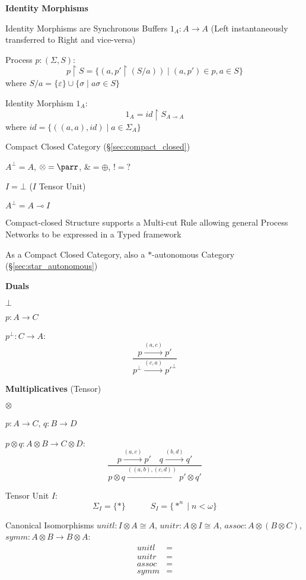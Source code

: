 \textbf{Identity Morphisms}

Identity Morphisms are Synchronous Buffers $1_A : A \rightarrow A$
(Left instantaneously transferred to Right and vice-versa)

Process $p : (\Sigma,S)$:
\[
  p \upharpoonright S = \{(a,p'\upharpoonright(S/a))
    \mid (a,p') \in p, a \in S\}
\]
where $S/a = \{\varepsilon\} \cup \{\sigma \mid a\sigma \in S\}$

Identity Morphism $1_A$:
\[
  1_A = id \upharpoonright S_{A \multimap A}
\]
where $id = \{((a,a),id) \mid a \in \Sigma_A\}$


\asterism


Compact Closed Category (\S\ref{sec:compact_closed})

$A^\bot = A$, $\otimes = \parr$, $\& = \oplus$, $! = ?$

$I = \bot$ ($I$ Tensor Unit)

$A^\bot = A \multimap I$

Compact-closed Structure supports a Multi-cut Rule allowing general
Process Networks to be expressed in a Typed framework

As a Compact Closed Category, also a $*$-autonomous Category
(\S\ref{sec:star_autonomous})


\textbf{Duals}

$\bot$

$p : A \rightarrow C$

$p^\bot : C \rightarrow A$:
\[
  \frac{p \xrightarrow{(a,c)} p'}
  {p^\bot \xrightarrow{(c,a)} p'^\bot}
\]


\textbf{Multiplicatives} (Tensor)

$\otimes$

$p : A \rightarrow C$, $q : B \rightarrow D$

$p \otimes q : A \otimes B \rightarrow C \otimes D$:
\[
  \frac{p \xrightarrow{(a,c)} p' \quad q \xrightarrow{(b,d)} q'}
  {p\otimes q \xrightarrow{((a,b),(c,d))} p' \otimes q'}
\]

Tensor Unit $I$:
\[
  \Sigma_I = \{*\} \quad\quad\quad S_I = \{*^n \mid n < \omega \}
\]

Canonical Isomorphisms $unitl : I \otimes A \cong A$, $unitr : A
\otimes I \cong A$, $assoc : A \otimes (B \otimes C)$, $symm : A
\otimes B \rightarrow B \otimes A$:
\begin{align*}
  unitl &= \\
  unitr &= \\
  assoc &= \\
  symm &=
\end{align*}

